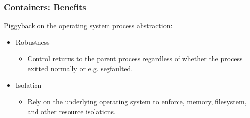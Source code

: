 \begin{frame}

\frametitle{Containers: Benefits}

Piggyback on the operating system process abstraction:

\begin{itemize}

\item Robustness

\begin{itemize}

\item Control returns to the parent process regardless of whether the process
exitted normally or e.g. segfaulted.

\end{itemize}

\item Isolation

\begin{itemize}

\item Rely on the underlying operating system to enforce, memory, filesystem,
and other resource isolations.

\end{itemize}

\end{itemize}

\end{frame}
